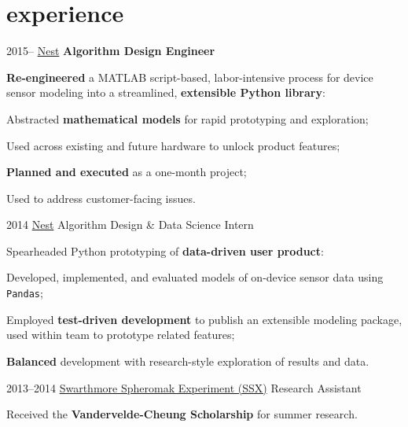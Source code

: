 \documentclass[]{friggeri-cv}
\begin{document}
\section{experience}

\begin{entrylist}
  \entry
    {2015--}
    {\href{http://nest.com}{Nest}}
    {\textbf{Algorithm Design Engineer}}
    {
      \bodyspace
      \begin{my-itemize}
      \item \textbf{Re-engineered} a MATLAB script-based, labor-intensive process for device sensor modeling into a streamlined, \textbf{extensible Python library}:

        \begin{my-itemize}
        \item Abstracted \textbf{mathematical models} for rapid prototyping and exploration;
        \item Used across existing and future hardware to unlock product features;
        \item \textbf{Planned and executed} as a one-month project;
        \item Used to address customer-facing issues.
        \end{my-itemize}
      \end{my-itemize}
    }
  \entry
    {2014}
    {\href{http://nest.com}{Nest}}
    {Algorithm Design \& Data Science Intern}
    {
      \bodyspace
      \begin{my-itemize}
      \item Spearheaded Python prototyping of \textbf{data-driven user product}:

      \begin{my-itemize}
      \item Developed, implemented, and evaluated models of on-device sensor data using \texttt{Pandas};
      \item Employed \textbf{test-driven development} to publish an extensible modeling package, used within team to prototype related features;
      \item \textbf{Balanced} development with research-style exploration of results and data.
      \end{my-itemize}

      \end{my-itemize}
    }
  \entry
    {2013--2014} %
    {\href{http://www.swarthmore.edu/ssx-lab}{Swarthmore Spheromak Experiment (SSX)}}
    {Research Assistant}
    {
      \bodyspace
      \begin{my-itemize}
      \item Received the \textbf{Vandervelde-Cheung Scholarship} for summer research.


\end{my-itemize}}
\end{entrylist}
\end{document}
